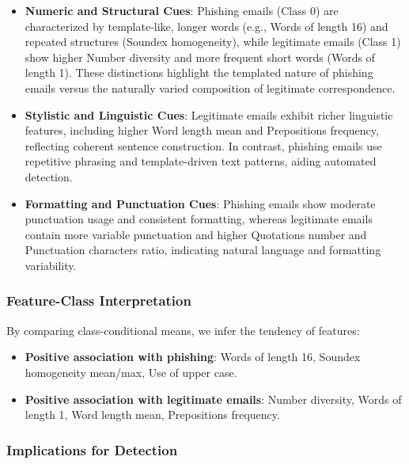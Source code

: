\documentclass[article,pdftex,10pt,a4paper,twocolumn]{article}
\begin{document}
\begin{itemize}

 \item \textbf{Numeric and Structural Cues}: Phishing emails (Class 0) are characterized by template-like, longer words (e.g., Words of length 16) and repeated structures (Soundex homogeneity), while legitimate emails (Class 1) show higher Number diversity and more frequent short words (Words of length 1). These distinctions highlight the templated nature of phishing emails versus the naturally varied composition of legitimate correspondence.

 \item \textbf{Stylistic and Linguistic Cues}: Legitimate emails exhibit richer linguistic features, including higher Word length mean and Prepositions frequency, reflecting coherent sentence construction. In contrast, phishing emails use repetitive phrasing and template-driven text patterns, aiding automated detection.

 \item \textbf{Formatting and Punctuation Cues}: Phishing emails show moderate punctuation usage and consistent formatting, whereas legitimate emails contain more variable punctuation and higher Quotations number and Punctuation characters ratio, indicating natural language and formatting variability.


\end{itemize}


\subsubsection{Feature-Class Interpretation}
\label{resultsfeatureclassinterpretation}

By comparing class-conditional means, we infer the tendency of features:

\begin{itemize}
 \item \textbf{Positive association with phishing}: Words of length 16, Soundex homogeneity mean/max, Use of upper case.
 \item \textbf{Positive association with legitimate emails}: Number diversity, Words of length 1, Word length mean, Prepositions frequency.
\end{itemize}


\subsubsection{Implications for Detection}
\label{resultsimplicationsfordetection}
\end{document}
